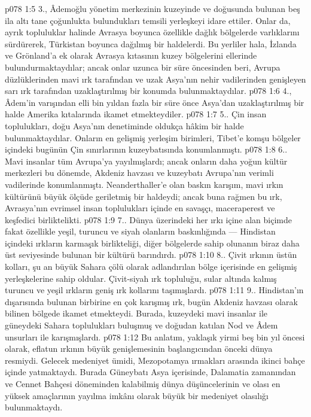 \vs p078 1:5 3.\bibnobreakspace {}, Âdemoğlu yönetim merkezinin kuzeyinde ve doğusunda bulunan beş ila altı tane çoğunlukta bulundukları temsili yerleşkeyi idare ettiler. Onlar da, ayrık topluluklar halinde Avrasya boyunca özellikle dağlık bölgelerde varlıklarını sürdürerek, Türkistan boyunca dağılmış bir haldelerdi. Bu yerliler hala, İzlanda ve Grönland’a ek olarak Avrasya kıtasının kuzey bölgelerini ellerinde bulundurmaktaydılar; ancak onlar uzunca bir süre öncesinden beri, Avrupa düzlüklerinden mavi ırk tarafından ve uzak Asya’nın nehir vadilerinden genişleyen sarı ırk tarafından uzaklaştırılmış bir konumda bulunmaktaydılar.
\vs p078 1:6 4.\bibnobreakspace {}, Âdem’in varışından elli bin yıldan fazla bir süre önce Asya’dan uzaklaştırılmış bir halde Amerika kıtalarında ikamet etmekteydiler.
\vs p078 1:7 5.\bibnobreakspace {}. Çin insan toplulukları, doğu Asya’nın denetiminde oldukça hâkim bir halde bulunmaktaydılar. Onların en gelişmiş yerleşim birimleri, Tibet’e komşu bölgeler içindeki bugünün Çin sınırlarının kuzeybatısında konumlanmıştı.
\vs p078 1:8 6.\bibnobreakspace {}. Mavi insanlar tüm Avrupa’ya yayılmışlardı; ancak onların daha yoğun kültür merkezleri bu dönemde, Akdeniz havzası ve kuzeybatı Avrupa’nın verimli vadilerinde konumlanmıştı. Neanderthaller’e olan baskın karışım, mavi ırkın kültürünü büyük ölçüde geriletmiş bir haldeydi; ancak buna rağmen bu ırk, Avrasya’nın evrimsel insan toplulukları içinde en savaşçı, maceraperest ve keşfedici birliktelikti.
\vs p078 1:9 7.\bibnobreakspace {}. Dünya üzerindeki her ırkı içine alan biçimde fakat özellikle yeşil, turuncu ve siyah olanların baskınlığında --- Hindistan içindeki ırkların karmaşık birlikteliği, diğer bölgelerde sahip olunanın biraz daha üst seviyesinde bulunan bir kültürü barındırdı.
\vs p078 1:10 8.\bibnobreakspace {}. Çivit ırkının üstün kolları, şu an büyük Sahara çölü olarak adlandırılan bölge içerisinde en gelişmiş yerleşkelerine sahip oldular. Çivit\hyp{}siyah ırk topluluğu, sular altında kalmış turuncu ve yeşil ırkların geniş ırk kollarını taşımışlardı.
\vs p078 1:11 9.\bibnobreakspace {}. Hindistan’ın dışarısında bulunan birbirine en çok karışmış ırk, bugün Akdeniz havzası olarak bilinen bölgede ikamet etmekteydi. Burada, kuzeydeki mavi insanlar ile güneydeki Sahara toplulukları buluşmuş ve doğudan katılan Nod ve Âdem unsurları ile karışmışlardı.
\vs p078 1:12 Bu anlatım, yaklaşık yirmi beş bin yıl öncesi olarak, eflatun ırkının büyük genişlemesinin başlangıcından önceki dünya resmiydi. Gelecek medeniyet ümidi, Mezopotamya ırmakları arasında ikinci bahçe içinde yatmaktaydı. Burada Güneybatı Asya içerisinde, Dalamatia zamanından ve Cennet Bahçesi döneminden kalabilmiş dünya düşüncelerinin ve olası en yüksek amaçlarının yayılma imkânı olarak büyük bir medeniyet olasılığı bulunmaktaydı.
